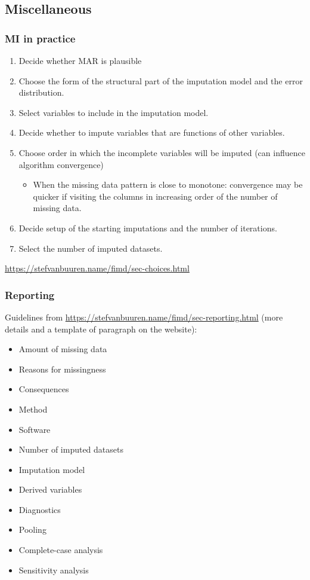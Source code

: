 \documentclass{beamer}
\begin{document}
\subsection{Miscellaneous}



\begin{frame}
\frametitle{MI in practice}

\begin{enumerate}
	\item Decide whether MAR is plausible
	\item Choose the form of the structural part of the imputation model and the error distribution.
	\item Select variables to include in the imputation model. %
	\item Decide whether to impute variables that are functions of other variables.
	\item Choose order in which the incomplete variables will be imputed (can influence algorithm convergence) 
		\begin{itemize}
			\item When the missing data pattern is close to monotone: convergence may be quicker if visiting the columns in increasing order of the number of missing data.
		\end{itemize}
	\item Decide setup of the starting imputations and the number of iterations.  
	\item Select the number of imputed datasets.
\end{enumerate}
\vfill
\footnotesize{\url{https://stefvanbuuren.name/fimd/sec-choices.html}}
\end{frame}






\begin{frame}
\frametitle{Reporting}

Guidelines from \footnotesize{\url{https://stefvanbuuren.name/fimd/sec-reporting.html}} (more details and a template of paragraph on the website):
\begin{itemize}
	\item Amount of missing data
	\item Reasons for missingness
	\item Consequences
	\item Method
	\item Software
	\item Number of imputed datasets
	\item Imputation model
	\item Derived variables
	\item Diagnostics
	\item Pooling
	\item Complete-case analysis
	\item Sensitivity analysis
\end{itemize}

\end{frame}
\end{document}
